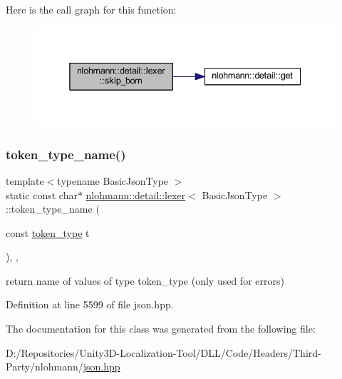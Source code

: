 Here is the call graph for this function\+:
\nopagebreak
\begin{figure}[H]
\begin{center}
\leavevmode
\includegraphics[width=338pt]{classnlohmann_1_1detail_1_1lexer_a709afd52def2e258dac0b8a67dc4ea26_cgraph}
\end{center}
\end{figure}
\mbox{\label{classnlohmann_1_1detail_1_1lexer_ae514e2005f0ce185f1ad366139e541e8}} 
\subsubsection{\texorpdfstring{token\_type\_name()}{token\_type\_name()}}
{\footnotesize\ttfamily template$<$typename Basic\+Json\+Type $>$ \\
static const char$\ast$ \mbox{\hyperlink{classnlohmann_1_1detail_1_1lexer}{nlohmann\+::detail\+::lexer}}$<$ Basic\+Json\+Type $>$\+::token\+\_\+type\+\_\+name (\begin{DoxyParamCaption}\item[{const \mbox{\hyperlink{classnlohmann_1_1detail_1_1lexer_a3f313cdbe187cababfc5e06f0b69b098}{token\+\_\+type}}}]{t }\end{DoxyParamCaption})\hspace{0.3cm}{\ttfamily [inline]}, {\ttfamily [static]}, {\ttfamily [noexcept]}}



return name of values of type token\+\_\+type (only used for errors) 



Definition at line 5599 of file json.\+hpp.



The documentation for this class was generated from the following file\+:\begin{DoxyCompactItemize}
\item 
D\+:/\+Repositories/\+Unity3\+D-\/\+Localization-\/\+Tool/\+D\+L\+L/\+Code/\+Headers/\+Third-\/\+Party/nlohmann/\mbox{\hyperlink{json_8hpp}{json.\+hpp}}\end{DoxyCompactItemize}
